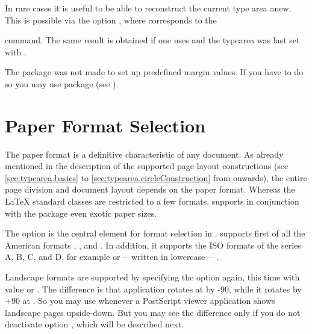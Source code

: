 \begin{Declaration}
\end{Declaration}%
In rare cases it is useful to be
able to reconstruct the current type area anew. This is possible via
the option , where
 corresponds to the 
\begin{lstcode}[belowskip=\dp\strutbox]
  \areaset[current]{\textwidth}{\textheight}
\end{lstcode}
command. The same result is obtained if one uses
 and the typearea was last set with
.%
%
\EndIndexGroup


The  package was not made to set up predefined
margin values. If you have to do so you may use package
 (see
\cite{package:geometry}).


\section{Paper Format Selection}
%
\BeginIndexGroup
{}%

The paper format is a definitive characteristic of any document. As
already mentioned in the description of the supported page layout
constructions (see \autoref{sec:typearea.basics} to
\autoref{sec:typearea.circleConstruction} from
 onwards), the entire page division
and document layout depends on the paper format. Whereas the {\LaTeX}
standard classes are restricted to a few formats, {\KOMAScript}
supports in conjunction with the  package even
exotic paper sizes.


\begin{Declaration}
\end{Declaration}%
The option  is the
central element for format selection in \KOMAScript.  
supports first of all the American formats ,
, and . In addition, it supports the
ISO formats of the series A, B, C, and D, for example 
or\,---\,written in lowercase\,---\,. 

Landscape formats are supported by specifying the option again, this time with
value  or
. The difference is
that application  rotates at  by
-90\Unit{\textdegree}, while it rotates by +90\Unit{\textdegree} at
. So you may use  whenever a PostScript
viewer application shows landscape pages upside-down. But you may see the
difference only if you do not deactivate option , which will
be described next.


